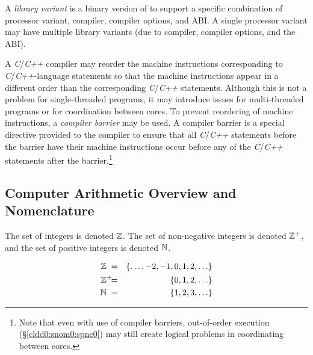 A \emph{library variant} is a binary 
version of \emph{\productbasenameshort{}} to support a 
specific combination of processor variant, compiler, 
compiler options, and ABI\@.  A single processor variant may 
have multiple library variants (due to compiler, compiler 
options, and the ABI).  

A \emph{C}/\emph{C++} compiler may reorder the machine 
instructions corresponding to \emph{C}/\emph{C++}-language 
statements so that the machine instructions appear in a 
different order than the corresponding \emph{C}/\emph{C++} 
statements.  Although this is not a problem for 
single-threaded programs, it may introduce issues for 
multi-threaded programs or for coordination between cores.  
To prevent reordering of machine instructions, a 
\emph{compiler barrier} may be used.  
A compiler barrier is a special directive provided to the 
compiler to ensure that all \emph{C}/\emph{C++} statements 
before the barrier have their machine instructions occur 
before any of the \emph{C}/\emph{C++} statements after the 
barrier.\footnote{Note that even with use of compiler 
barriers, out-of-order execution 
(\S{}\ref{cldd0:snom0:spnc0}) may still create logical 
problems in coordinating between cores.} 



\subsection{Computer Arithmetic Overview and Nomenclature}
\label{cldd0:snom0:scan0}

The set of integers is denoted 
${\mathbb{Z}}{}$\@.  The set of 
non-negative integers is denoted 
${\mathbb{Z}^+}{}$, and 
the set of positive integers is denoted 
${\mathbb{N}}{}$.  

\begin{eqnarray}
\label{eq:ciov0:snom0:scan0:01}
{\mathbb{Z}}{}   \;    & = & \{ \ldots , -2, -1, 0, 1, 2, \ldots \} \\
\label{eq:ciov0:snom0:scan0:02}
{\mathbb{Z}^+}{} \!\!\!\!\; & = & \{ 0, 1, 2, \ldots \}         \\
\label{eq:ciov0:snom0:scan0:03}
{\mathbb{N}}{}  \;  & = & \{ 1, 2, 3, \ldots \}
\end{eqnarray}

